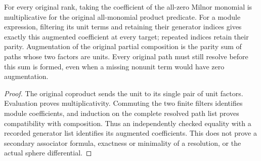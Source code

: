 \begin{lemma}
  \label{lem:lin-secondary-augmentation}
  \leanok
  For every original rank, taking the coefficient of the all-zero Milnor
  monomial is multiplicative for the original all-monomial product predicate.
  For a module expression, filtering its unit terms and retaining their
  generator indices gives exactly this augmented coefficient at every target;
  repeated indices retain their parity. Augmentation of the original partial
  composition is the parity sum of paths whose two factors are units.
  Every original path must still resolve before this sum is formed, even
  when a missing nonunit term would have zero augmentation.
\end{lemma}
\begin{proof}
  \leanok
  The original coproduct sends the unit to its single pair of unit factors.
  Evaluation proves multiplicativity. Commuting the two finite filters
  identifies module coefficients, and induction on the complete resolved
  path list proves compatibility with composition. Thus an independently
  checked equality with a recorded generator list identifies its augmented
  coefficients. This does not prove a secondary associator formula,
  exactness or minimality of a resolution, or the actual sphere differential.
\end{proof}

